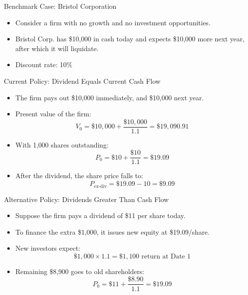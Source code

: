 \begin{frame}{Benchmark Case: Bristol Corporation}

\begin{itemize}
    \item Consider a firm with no growth and no investment opportunities.
    \item Bristol Corp. has \$10,000 in cash today and expects \$10,000 more next year, after which it will liquidate.
\end{itemize}

\vspace{3mm}
\begin{center}
\end{center}

\begin{itemize}
    \item Discount rate: 10\%
\end{itemize}

\end{frame}

\begin{frame}{Current Policy: Dividend Equals Current Cash Flow}

\begin{itemize}
    \item The firm pays out \$10,000 immediately, and \$10,000 next year.
    \item Present value of the firm:
    \[
        V_0 = \$10,000 + \frac{\$10,000}{1.1} = \$19,090.91
    \]
    \item With 1,000 shares outstanding:
    \[
        P_0 = \$10 + \frac{\$10}{1.1} = \$19.09
    \]
    \item After the dividend, the share price falls to:
    \[
        P_{\text{ex-div}} = \$19.09 - 10 = \$9.09
    \]
\end{itemize}

\end{frame}

\begin{frame}{Alternative Policy: Dividends Greater Than Cash Flow}

\begin{itemize}
    \item Suppose the firm pays a dividend of \$11 per share today.
    \item To finance the extra \$1,000, it issues new equity at \$19.09/share.
    \item New investors expect:
    \[
        \$1,000 \times 1.1 = \$1,100 \text{ return at Date 1}
    \]
    \item Remaining \$8,900 goes to old shareholders:
    \[
        P_0 = \$11 + \frac{\$8.90}{1.1} = \$19.09
    \]
\end{itemize}

\end{frame}

